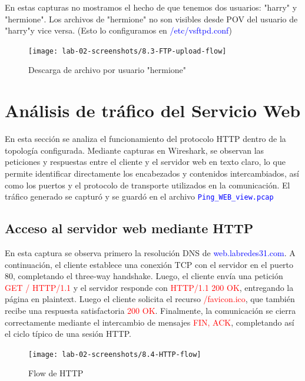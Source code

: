 \documentclass[10pt]{article}
\begin{document}
En estas capturas no mostramos el hecho de que tenemos dos usuarios: "harry" y "hermione". Los archivos de "hermione" no son visibles desde POV del usuario de "harry"y vice versa. (Esto lo configuramos en \textcolor{blue}{/etc/vsftpd.conf})

\begin{figure}[H]
    \centering
    \texttt{[image: lab-02-screenshots/8.3-FTP-upload-flow]}
    \caption{Descarga de archivo por usuario "hermione"}
\end{figure}
\renewcommand{\thesection}{8.\arabic{section}}
\section{Análisis de tráfico del Servicio Web}
En esta sección se analiza el funcionamiento del protocolo HTTP dentro de la topología configurada. Mediante capturas en Wireshark, se observan las peticiones y respuestas entre el cliente y el servidor web en texto claro, lo que permite identificar directamente los encabezados y contenidos intercambiados, así como los puertos y el protocolo de transporte utilizados en la comunicación. El tráfico generado se capturó y se guardó en el archivo \textcolor{blue}{\texttt{Ping\_WEB\_view.pcap}}
\subsection{Acceso al servidor web mediante HTTP}
En esta captura se observa primero la resolución DNS de \textcolor{blue}{web.labredes31.com}. A continuación, el cliente establece una conexión TCP con el servidor en el puerto 80, completando el three-way handshake. Luego, el cliente envía una petición \textcolor{red}{GET / HTTP/1.1} y el servidor responde con \textcolor{red}{HTTP/1.1 200 OK}, entregando la página en plaintext. Luego el cliente solicita el recurso \textcolor{red}{/favicon.ico}, que también recibe una respuesta satisfactoria \textcolor{red}{200 OK}. Finalmente, la comunicación se cierra correctamente mediante el intercambio de mensajes \textcolor{red}{FIN, ACK}, completando así el ciclo típico de una sesión HTTP.


\begin{figure}[H]
    \centering
    \texttt{[image: lab-02-screenshots/8.4-HTTP-flow]}
    \caption{Flow de HTTP}
\end{figure}
\end{document}
